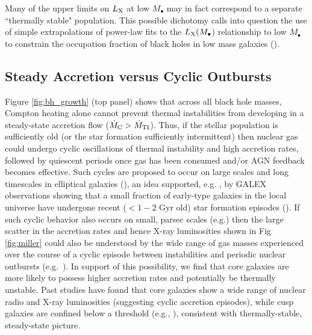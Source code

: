 \documentclass[usenatbib,fleqn]{mn2e}
\begin{document}
Many of the upper
limits on $L_{\rm X}$ at low $M_{\bullet}$ may in fact correspond to a
separate ``thermally stable" population.  This possible dichotomy
calls into question the use of simple extrapolations of power-law fits
to the $L_{\rm X}(M_{\bullet}$) relationship to low $M_{\bullet}$ to
constrain the occupation fraction of black holes in low mass galaxies
(\citealt{Miller+15}).


\subsection{Steady Accretion versus Cyclic Outbursts}
\label{sec:cycle}

Figure \ref{fig:bh_growth} (top panel) shows that across all black
hole masses, Compton heating alone cannot prevent thermal
instabilities from developing in a steady-state accretion flow
($\dot{M}_{\rm C} > \dot{M}_{\rm TI}$).  Thus, if the stellar
population is sufficiently old (or the star formation sufficiently
intermittent) then nuclear gas could undergo cyclic oscillations of
thermal instability and high accretion rates, followed by quiescent
periods once gas has been consumed and/or AGN feedback becomes
effective.  Such cycles are proposed to occur on large scales and long
timescales in elliptical galaxies (\citealt{Ciotti+10}), an idea
supported, e.g. , by GALEX observations showing that a small fraction
of early-type galaxies in the local universe have undergone recent ($<
1-2$ Gyr old) star formation episodes (\citealt{Donas+07}).  If such
cyclic behavior also occurs on small, parsec scales (e.g.) then the
large scatter in the accretion rates and hence X-ray luminosities
shown in Fig \ref{fig:miller} could also be understood by the wide
range of gas masses experienced over the course of a cyclic episode
between instabilities and periodic nuclear outbursts
(e.g.~\citealt{Ciotti+10}).  In support of this possibility, we find
that core galaxies are more likely to possess higher accretion rates
and potentially be thermally unstable.  Past studies have found that
core galaxies show a wide range of nuclear radio and X-ray
luminosities (suggesting cyclic accretion episodes), while cusp
galaxies are confined below a threshold (e.g., \citealt{Bender+89,
  Pellegrini99, Capetti&Balmaverde05}), consistent with
thermally-stable, steady-state picture.
\end{document}
